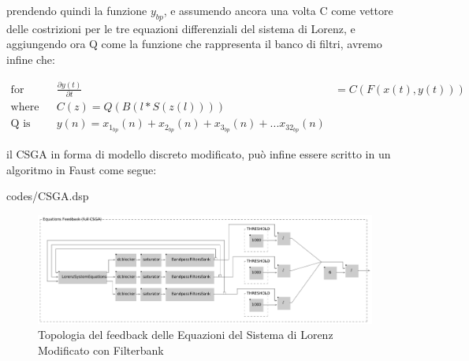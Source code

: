 prendendo quindi la funzione \( y_{bp} \), e assumendo ancora una volta C come vettore delle costrizioni
per le tre equazioni differenziali del sistema di Lorenz, 
e aggiungendo ora Q come la funzione che rappresenta il banco di filtri, 
avremo infine che:

\begin{align*}
    \text{for} && \frac{\partial y(t)}{\partial t} & = C(F(x(t), y(t))) \\
    \text{where} && C(z) = Q(B(l * S(z(l)))) \\
    \text{Q is} && y(n) = x_{{1}}_{bp}(n) + x_{{2}}_{bp}(n) + x_{{3}}_{bp}(n) + ... x_{{32}}_{bp}(n)
\end{align*}

il CSGA in forma di modello discreto modificato,
può infine essere scritto in un algoritmo in Faust come segue:

\vspace{0.5cm} 

{codes/CSGA.dsp}

\begin{figure}[h!]
\begin{center}
    \includegraphics[width=14cm]{figures/LorenzSystemFB3.pdf}
    \caption {Topologia del feedback delle Equazioni del Sistema di Lorenz Modificato con Filterbank}
\end{center}
\vspace{0.5cm}
\end{figure}

